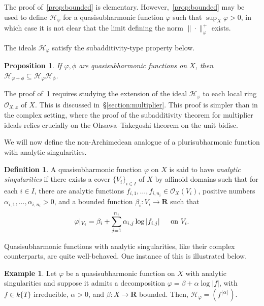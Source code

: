 \documentclass[10pt,reqno]{amsart}
\theoremstyle{plain}
\newtheorem{proposition}[theorem]{Proposition}
\theoremstyle{definition}
\newtheorem{example}[theorem]{Example}
\newtheorem{definition}[theorem]{Definition}
\newcommand{\R}{\mathbf{R}}
\renewcommand{\H}{\mathcal{H}}
\numberwithin{equation}{section}
\renewcommand{\O}{\mathcal{O}}
\begin{document}
The proof of~\cref{prop:bounded} is elementary. However,~\cref{prop:bounded} may be used to define $\H_{\varphi}$ for a quasisubharmonic function $\varphi$ such that $\sup_X \varphi > 0$, in which case it is not clear that the limit defining the norm $\| \cdot \|_{\varphi}^+$ exists.

The ideals $\H_{\varphi}$ satisfy the subadditivity-type property below.

\begin{proposition}\label{prop:subadditivity}
If $\varphi,\phi$ are quasisubharmonic functions on $X$, then $\H_{\varphi + \phi} \subseteq \H_{\varphi} \H_{\phi}$.
\end{proposition}

The proof of~\cref{prop:subadditivity} requires studying the extension of the ideal $\H_{\varphi}$ to each local ring $\O_{X,x}$ of $X$. This is discussed in~\S\ref{section:multiplier}. This proof is simpler than in the complex setting, where the proof of the subadditivity theorem for multiplier ideals relies crucially on the Ohsawa--Takegoshi theorem on the unit bidisc.

We will now define the non-Archimedean analogue of a plurisubharmonic function with analytic singularities. 

\begin{definition}
A quasisubharmonic function $\varphi$ on $X$ is said to have \emph{analytic singularities} if there exists a cover $\{ V_{i} \}_{i \in I}$ of $X$ by affinoid domains such that for each $i \in I$, there are analytic functions $f_{i,1},\ldots,f_{i,n_{i}} \in \O_X(V_{i})$, positive numbers $\alpha_{i,1},\ldots,\alpha_{i,n_i} > 0$, and a bounded function $\beta_i \colon V_i \to \R$ such that 
$$
\varphi|_{V_i} = \beta_i + \sum_{j=1}^{n_i} \alpha_{i,j} \log |f_{i,j}| \textrm{\hspace{12pt} on $V_i$.}
$$
\end{definition}

Quasisubharmonic functions with analytic singularities, like their complex counterparts, are quite well-behaved. One instance of this is illustrated below.

\begin{example}
Let $\varphi$ be a quasisubharmonic function on $X$ with analytic singularities and suppose it admits a decomposition $\varphi = \beta + \alpha \log |f|$, with $f \in k\{ T \}$ irreducible, $\alpha > 0$, and $\beta \colon X \to \R$ bounded. Then, $\H_{\varphi} = (f^{\lfloor \alpha \rfloor})$.
\end{example}
\end{document}
